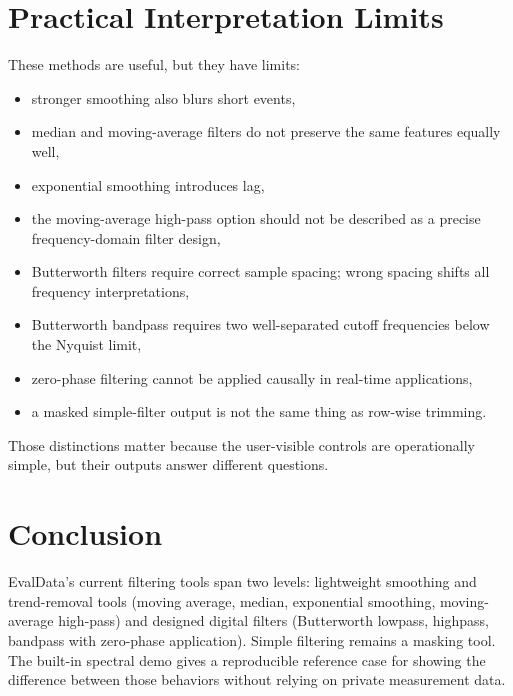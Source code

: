 \documentclass[11pt,a4paper]{article}
\begin{document}
\section{Practical Interpretation Limits}

These methods are useful, but they have limits:

\begin{itemize}
    \item stronger smoothing also blurs short events,
    \item median and moving-average filters do not preserve the same features equally well,
    \item exponential smoothing introduces lag,
    \item the moving-average high-pass option should not be described as a precise frequency-domain filter design,
    \item Butterworth filters require correct sample spacing; wrong spacing shifts all frequency interpretations,
    \item Butterworth bandpass requires two well-separated cutoff frequencies below the Nyquist limit,
    \item zero-phase filtering cannot be applied causally in real-time applications,
    \item a masked simple-filter output is not the same thing as row-wise trimming.
\end{itemize}

Those distinctions matter because the user-visible controls are operationally simple, but their outputs answer different questions.

\section{Conclusion}

EvalData's current filtering tools span two levels: lightweight smoothing and trend-removal tools (moving average, median, exponential smoothing, moving-average high-pass) and designed digital filters (Butterworth lowpass, highpass, bandpass with zero-phase application). Simple filtering remains a masking tool. The built-in spectral demo gives a reproducible reference case for showing the difference between those behaviors without relying on private measurement data.
\end{document}
